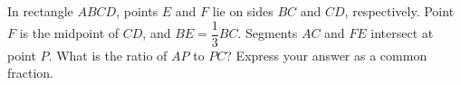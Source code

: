 In rectangle $ABCD$, points $E$ and $F$ lie on sides $BC$ and $CD$, respectively. Point $F$ is the midpoint of $CD$, and $BE=\dfrac{1}{3}BC$. Segments $AC$ and $FE$ intersect at point $P$. What is the ratio of $AP$ to $PC$? Express your answer as a common fraction.
